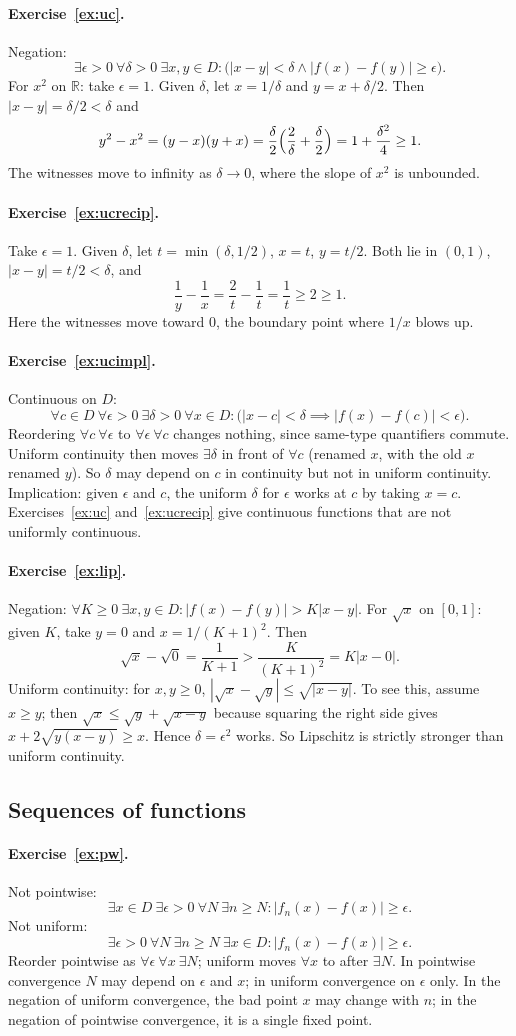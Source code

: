 \documentclass{workbook}
\theoremstyle{definition}
\newcommand{\R}{\mathbb{R}}
\newcommand{\ans}[1]{\paragraph{Exercise~\ref{#1}.}}
\begin{document}
\ans{ex:uc}
Negation:
\[
  \exists \epsilon > 0\ \forall \delta > 0\ \exists x, y \in D : \bigl(|x - y| < \delta \land |f(x) - f(y)| \ge \epsilon\bigr).
\]
For $x^2$ on $\R$: take $\epsilon = 1$. Given $\delta$, let $x = 1/\delta$ and $y = x + \delta/2$. Then $|x - y| = \delta/2 < \delta$ and
\[
  y^2 - x^2 = (y - x)(y + x) = \frac{\delta}{2}\Bigl(\frac{2}{\delta} + \frac{\delta}{2}\Bigr) = 1 + \frac{\delta^2}{4} \ge 1.
\]
The witnesses move to infinity as $\delta \to 0$, where the slope of $x^2$ is unbounded.

\ans{ex:ucrecip}
Take $\epsilon = 1$. Given $\delta$, let $t = \min(\delta, 1/2)$, $x = t$, $y = t/2$. Both lie in $(0,1)$, $|x - y| = t/2 < \delta$, and
\[
  \frac{1}{y} - \frac{1}{x} = \frac{2}{t} - \frac{1}{t} = \frac{1}{t} \ge 2 \ge 1.
\]
Here the witnesses move toward $0$, the boundary point where $1/x$ blows up.

\ans{ex:ucimpl}
Continuous on $D$:
\[
  \forall c \in D\ \forall \epsilon > 0\ \exists \delta > 0\ \forall x \in D : \bigl(|x - c| < \delta \implies |f(x) - f(c)| < \epsilon\bigr).
\]
Reordering $\forall c\ \forall \epsilon$ to $\forall \epsilon\ \forall c$ changes nothing, since same-type quantifiers commute. Uniform continuity then moves $\exists \delta$ in front of $\forall c$ (renamed $x$, with the old $x$ renamed $y$). So $\delta$ may depend on $c$ in continuity but not in uniform continuity. Implication: given $\epsilon$ and $c$, the uniform $\delta$ for $\epsilon$ works at $c$ by taking $x = c$. Exercises~\ref{ex:uc} and~\ref{ex:ucrecip} give continuous functions that are not uniformly continuous.

\ans{ex:lip}
Negation: $\forall K \ge 0\ \exists x, y \in D : |f(x) - f(y)| > K |x - y|$. For $\sqrt{x}$ on $[0,1]$: given $K$, take $y = 0$ and $x = 1/(K+1)^2$. Then
\[
  \sqrt{x} - \sqrt{0} = \frac{1}{K+1} > \frac{K}{(K+1)^2} = K |x - 0|.
\]
Uniform continuity: for $x, y \ge 0$, $|\sqrt{x} - \sqrt{y}| \le \sqrt{|x - y|}$. To see this, assume $x \ge y$; then $\sqrt{x} \le \sqrt{y} + \sqrt{x - y}$ because squaring the right side gives $x + 2\sqrt{y(x-y)} \ge x$. Hence $\delta = \epsilon^2$ works. So Lipschitz is strictly stronger than uniform continuity.

\subsection*{Sequences of functions}

\ans{ex:pw}
Not pointwise:
\[
  \exists x \in D\ \exists \epsilon > 0\ \forall N\ \exists n \ge N : |f_n(x) - f(x)| \ge \epsilon.
\]
Not uniform:
\[
  \exists \epsilon > 0\ \forall N\ \exists n \ge N\ \exists x \in D : |f_n(x) - f(x)| \ge \epsilon.
\]
Reorder pointwise as $\forall \epsilon\ \forall x\ \exists N$; uniform moves $\forall x$ to after $\exists N$. In pointwise convergence $N$ may depend on $\epsilon$ and $x$; in uniform convergence on $\epsilon$ only. In the negation of uniform convergence, the bad point $x$ may change with $n$; in the negation of pointwise convergence, it is a single fixed point.
\end{document}
